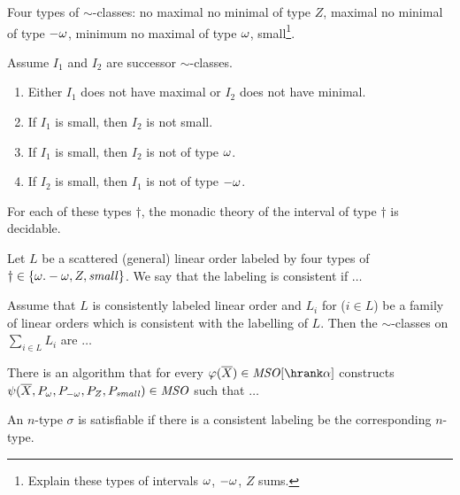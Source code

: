  Four types of $\sim$-classes: no maximal no minimal of type $Z$, maximal no minimal of type $-\omega$, minimum no maximal of type $\omega$, small\footnote{Explain these types of intervals $\omega$, $-\omega$, $Z$ sums.}.
 \begin{lemma}\label{lem:properties}
Assume  $I_1$ and $I_2$ are successor $\sim$-classes.
   \begin{enumerate}
     \item %
Either $I_1$ does not have maximal or $I_2$ does not have minimal.
 
     \item If $I_1$ is small, then $I_2$ is not small.
     \item  If $I_1$ is small, then $I_2$ is not of type $\omega$.
     \item  If $I_2$ is small, then $I_1$ is not of type $-\omega$.
   \end{enumerate}
 \end{lemma}
  
 \begin{lemma} For each  of these types $\dag$, the monadic theory of the interval of type $\dag$ is decidable.
 \end{lemma}
 Let $L$ be a scattered (general) linear order labeled by four types of $\dag\in \{\omega.-\omega,Z,\mathit{small}\}$. %
 We say that the labeling is consistent if $\dots$
 \begin{lemma}
   Assume that $L$ is consistently labeled linear order and $L_i$ for ($i\in L$) be a family of linear orders which is consistent with the labelling of $L$.
   Then the $\sim$-classes on $\sum_{i\in L} L_i$ are $\dots$
 \end{lemma}
 \begin{lemma}[Translation]\label{lem:translation2} There is an algorithm that 
 for every $\vp (\vX)\in \MSO[\hrank\alpha]$ constructs $\psi(\overline{X}, P_\omega,P_{-\omega},P_Z,P_{\mathit{small}})\in \mathit{MSO}$
 such that $\dots$
    
 \end{lemma}
An $n$-type  $\sigma$ is satisfiable if there is a consistent labeling be the corresponding $n$-type.